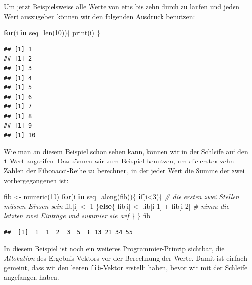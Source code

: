 \documentclass[
]{book}
\newenvironment{Shaded}{\begin{snugshade}}{\end{snugshade}}
\newcommand{\CommentTok}[1]{\textcolor[rgb]{0.56,0.35,0.01}{\textit{#1}}}
\newcommand{\ControlFlowTok}[1]{\textcolor[rgb]{0.13,0.29,0.53}{\textbf{#1}}}
\newcommand{\DecValTok}[1]{\textcolor[rgb]{0.00,0.00,0.81}{#1}}
\newcommand{\FunctionTok}[1]{\textcolor[rgb]{0.00,0.00,0.00}{#1}}
\newcommand{\NormalTok}[1]{#1}
\newcommand{\OtherTok}[1]{\textcolor[rgb]{0.56,0.35,0.01}{#1}}
\newcommand{\SpecialCharTok}[1]{\textcolor[rgb]{0.00,0.00,0.00}{#1}}
\begin{document}
Um jetzt Beispielsweise alle Werte von eins bis zehn durch zu laufen und jeden Wert auszugeben können wir den folgenden Ausdruck benutzen:

\begin{Shaded}
\begin{Highlighting}[]
\ControlFlowTok{for}\NormalTok{(i }\ControlFlowTok{in} \FunctionTok{seq\_len}\NormalTok{(}\DecValTok{10}\NormalTok{))\{}
  \FunctionTok{print}\NormalTok{(i)}
\NormalTok{\}}
\end{Highlighting}
\end{Shaded}

\begin{verbatim}
## [1] 1
## [1] 2
## [1] 3
## [1] 4
## [1] 5
## [1] 6
## [1] 7
## [1] 8
## [1] 9
## [1] 10
\end{verbatim}

Wie man an diesem Beispiel schon sehen kann, können wir in der Schleife auf den \texttt{i}-Wert zugreifen. Das können wir zum Beispiel benutzen, um die ersten zehn Zahlen der Fibonacci-Reihe zu berechnen, in der jeder Wert die Summe der zwei vorhergegangenen ist:

\begin{Shaded}
\begin{Highlighting}[]
\NormalTok{fib }\OtherTok{\textless{}{-}} \FunctionTok{numeric}\NormalTok{(}\DecValTok{10}\NormalTok{)}
\ControlFlowTok{for}\NormalTok{(i }\ControlFlowTok{in} \FunctionTok{seq\_along}\NormalTok{(fib))\{}
  \ControlFlowTok{if}\NormalTok{(i}\SpecialCharTok{\textless{}}\DecValTok{3}\NormalTok{)\{ }\CommentTok{\# die ersten zwei Stellen müssen Einsen sein}
\NormalTok{    fib[i] }\OtherTok{\textless{}{-}} \DecValTok{1}
\NormalTok{  \}}\ControlFlowTok{else}\NormalTok{\{}
\NormalTok{    fib[i] }\OtherTok{\textless{}{-}}\NormalTok{ fib[i}\DecValTok{{-}1}\NormalTok{] }\SpecialCharTok{+}\NormalTok{ fib[i}\DecValTok{{-}2}\NormalTok{] }\CommentTok{\# nimm die letzten zwei Einträge und summier sie auf}
\NormalTok{  \}}
\NormalTok{\}}
\NormalTok{fib}
\end{Highlighting}
\end{Shaded}

\begin{verbatim}
##  [1]  1  1  2  3  5  8 13 21 34 55
\end{verbatim}

In diesem Beispiel ist noch ein weiteres Programmier-Prinzip sichtbar, die \emph{Allokation} des Ergebnis-Vektors vor der Berechnung der Werte. Damit ist einfach gemeint, dass wir den leeren \texttt{fib}-Vektor erstellt haben, bevor wir mit der Schleife angefangen haben.
\end{document}
